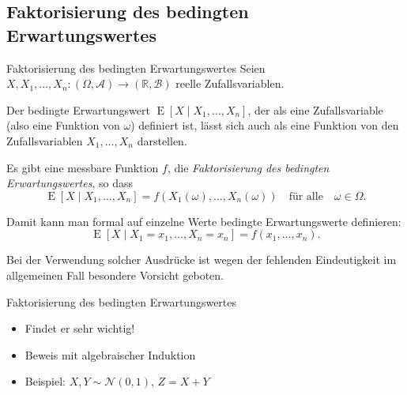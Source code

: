 \subsection{Faktorisierung des bedingten Erwartungswertes}

\begin{defi}{Faktorisierung des bedingten Erwartungswertes}
    Seien $X, X_1, \ldots, X_n: (\Omega, \mathcal{A}) \to (\mathbb{R}, \mathcal{B})$ reelle Zufallsvariablen.

    Der bedingte Erwartungswert $\operatorname{E} [X \mid X_1, \ldots, X_n]$, der als eine Zufallsvariable (also eine Funktion von $\omega$) definiert ist, lässt sich auch als eine Funktion von den Zufallsvariablen $X_1, \ldots, X_n$ darstellen.

    Es gibt eine messbare Funktion $f$, die \emph{Faktorisierung des bedingten Erwartungswertes}, so dass
    \[
        \operatorname{E} [X \mid X_1, \ldots, X_n] = f(X_1(\omega), \ldots, X_n(\omega)) \quad \text{für alle} \quad \omega \in \Omega.
    \]

    Damit kann man formal auf einzelne Werte bedingte Erwartungswerte definieren:
    \[
        \operatorname{E} [X \mid X_1 = x_1, \ldots, X_n = x_n] = f(x_1, \ldots, x_n).
    \]

    Bei der Verwendung solcher Ausdrücke ist wegen der fehlenden Eindeutigkeit im allgemeinen Fall besondere Vorsicht geboten.
\end{defi}

\begin{info}{Faktorisierung des bedingten Erwartungswertes}
    \begin{itemize}
        \item Findet er sehr wichtig!
        \item Beweis mit algebraischer Induktion
        \item Beispiel: $X, Y \sim \mathcal{N}(0, 1)$, $Z = X + Y$
    \end{itemize}
\end{info}

